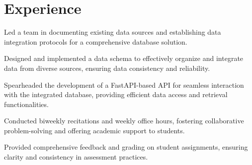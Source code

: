 \documentclass[letterpaper]{AMcEnaneyResume} %
\begin{document}
\begin{minipage}[t]{0.66\textwidth} %


\section{Experience}


        \vspace{\topsep} %
        \begin{tightitemize}
            \item Led a team in documenting existing data sources and establishing data integration protocols for a comprehensive database solution.
            \item Designed and implemented a data schema to effectively organize and integrate data from diverse sources, ensuring data consistency and reliability.
            \item Spearheaded the development of a FastAPI-based API for seamless interaction with the integrated database, providing efficient data access and retrieval functionalities.
        \end{tightitemize}

        \sectionspace %



        \begin{tightitemize}
            \item Conducted biweekly recitations and weekly office hours, fostering collaborative problem-solving and offering academic support to students.
            \item Provided comprehensive feedback and grading on student assignments, ensuring clarity and consistency in assessment practices.
        \end{tightitemize}

        \sectionspace %


\end{minipage}
\end{document}
